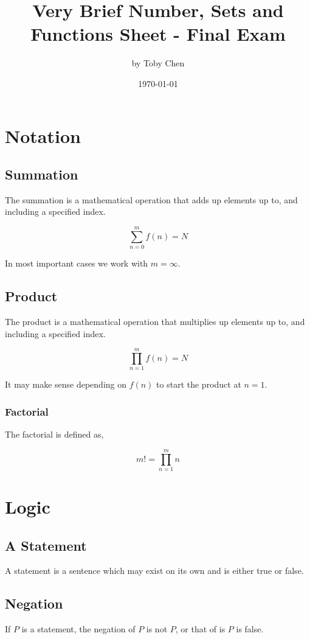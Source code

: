 \documentclass{article}
\title{Very Brief Number, Sets and Functions Sheet - Final Exam}
\author{by Toby Chen}
\date{\today}
\begin{document}
    \maketitle

    \tableofcontents

    \section{Notation}

        \subsection{Summation}
            The summation is a mathematical operation that adds up elements up to, and including a specified index.

            \[\sum_{n = 0}^{m} f(n) = N\]

            In most important cases we work with $m = \infty$.

        \subsection{Product}
            The product is a mathematical operation that multiplies up elements up to, and including a specified  index.

            \[\prod_{n = 1}^{m} f(n) = N\]

            It may make sense depending on $f(n)$ to start the product at $n=1$.

            \subsubsection{Factorial}
                The factorial is defined as,

                \[m! = \prod_{n = 1}^{m}n\]

    \section{Logic}
        \subsection{A Statement}
            A statement is a sentence which may exist on its own and is either true or false.

        \subsection{Negation}
            If $P$ is a statement, the negation of $P$ is not $P$, or that of is $P$ is false.\\
\end{document}
